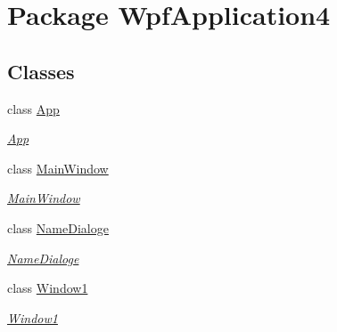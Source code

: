 \hypertarget{namespaceWpfApplication4}{\section{Package Wpf\-Application4}
\label{namespaceWpfApplication4}
}
\subsection*{Classes}
\begin{DoxyCompactItemize}
\item 
class \hyperlink{classWpfApplication4_1_1App}{App}
\begin{DoxyCompactList}\small\item\em \hyperlink{classWpfApplication4_1_1App}{App} \end{DoxyCompactList}\item 
class \hyperlink{classWpfApplication4_1_1MainWindow}{Main\-Window}
\begin{DoxyCompactList}\small\item\em \hyperlink{classWpfApplication4_1_1MainWindow}{Main\-Window} \end{DoxyCompactList}\item 
class \hyperlink{classWpfApplication4_1_1NameDialoge}{Name\-Dialoge}
\begin{DoxyCompactList}\small\item\em \hyperlink{classWpfApplication4_1_1NameDialoge}{Name\-Dialoge} \end{DoxyCompactList}\item 
class \hyperlink{classWpfApplication4_1_1Window1}{Window1}
\begin{DoxyCompactList}\small\item\em \hyperlink{classWpfApplication4_1_1Window1}{Window1} \end{DoxyCompactList}\end{DoxyCompactItemize}
